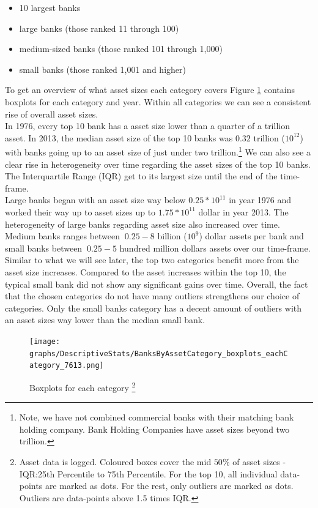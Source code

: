 \documentclass[12pt, a4paper]{article} %
\begin{document}
\begin{itemize}
 \item 10 largest banks
 \item large banks (those ranked
  11 through 100)
 \item medium-sized banks (those ranked 101 through
 1,000)
 \item small banks (those ranked 1,001 and higher)
 \end{itemize} 

To get an overview of what asset sizes each category covers Figure \ref{fig:cat_boxplot} contains boxplots for each category and year. Within all categories we can see a consistent rise of overall asset sizes.\\
In 1976, every top 10 bank has a asset size lower than a quarter of a trillion asset.
In 2013, the median asset size of the top 10 banks was $0.32$ trillion ($10^{12}$) with banks going up to an asset size of just under two trillion.\footnote{Note, we have not combined commercial banks with their matching bank holding company. Bank Holding Companies have asset sizes beyond two trillion.} We can also see a clear rise in heterogeneity over time regarding the asset sizes of the top 10 banks. The Interquartile Range (IQR) get to its largest size until the end of the time-frame.\\
Large banks began with an asset size way below $0.25*10^{11}$ in year 1976 and worked their way up to asset sizes up to $1.75*10^{11}$ dollar in year 2013. The heterogeneity of large banks regarding asset size also increased over time. \\
Medium banks ranges between $~0.25-8$ billion ($10^{9}$) dollar assets per bank and small banks between $~0.25-5$ hundred million dollars assets over our time-frame. Similar to what we will see later, the top two categories benefit more from the asset size increases. Compared to the asset increases within the top 10, the typical small bank did not show any significant gains over time. 
Overall, the fact that the chosen categories do not have many outliers strengthens our choice of categories. Only the small banks category has a decent amount of outliers with an asset sizes way lower than the median small bank. 

\begin{figure}[H]
\begin{minipage}{\textwidth}
\centering
\caption[1]{Boxplots for each category \footnote{Asset data is logged. Coloured boxes cover the mid $50\%$ of asset sizes - IQR:25th Percentile to 75th Percentile. For the top 10, all individual data-points are marked as dots. For the rest, only outliers are marked as dots. Outliers are data-points above 1.5 times IQR.} }
\texttt{[image: graphs/DescriptiveStats/BanksByAssetCategory\_boxplots\_eachCategory\_7613.png]}
\label{fig:cat_boxplot}
\end{minipage}
\end{figure}
\end{document}

